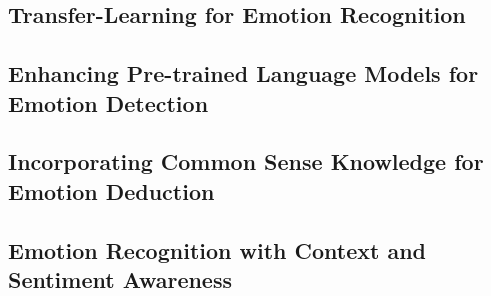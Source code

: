 \subsection{Transfer-Learning for Emotion Recognition}

\subsection{Enhancing Pre-trained Language Models for Emotion Detection}

\subsection{Incorporating Common Sense Knowledge for Emotion Deduction}

\subsection{Emotion Recognition with Context and Sentiment Awareness}

